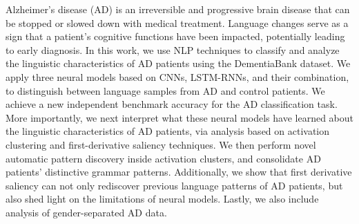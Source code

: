 Alzheimer's disease (AD) is an irreversible and progressive brain disease that can be stopped or slowed down with medical treatment. Language changes serve as a sign that a patient's cognitive functions have been impacted, potentially leading to early diagnosis. In this work, we use NLP techniques to classify and analyze the linguistic characteristics of AD patients using the DementiaBank dataset. We apply three neural models based on CNNs, LSTM-RNNs, and their combination, to distinguish between language samples from AD and control patients. We achieve a new independent benchmark accuracy for the AD classification task. More importantly, we next interpret what these neural models have learned about the linguistic characteristics of AD patients, via analysis based on activation clustering and first-derivative saliency techniques. We then perform novel automatic pattern discovery inside activation clusters, and consolidate AD patients' distinctive grammar patterns. Additionally, we show that first derivative saliency can not only rediscover previous language patterns of AD patients, but also shed light on the limitations of neural models. Lastly, we also include analysis of gender-separated AD data.
